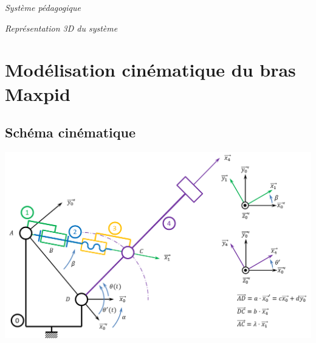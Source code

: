 \documentclass[10pt]{article}
\begin{document}

\begin{minipage}[b]{.3\linewidth}
\begin{center}

\textit{Système pédagogique}
\end{center}
\end{minipage} \hfill
\begin{minipage}[b]{.3\linewidth}
\begin{center}

\textit{Représentation 3D du système}
\end{center}
\end{minipage} \hfill
\begin{minipage}[b]{.3\linewidth}
\begin{center}

\end{center}
\end{minipage}



\setlength{\parskip}{0ex plus 0.2ex minus 0ex}
 \renewcommand{\contentsname}{}
 \renewcommand{\baselinestretch}{1}

\tableofcontents

 \renewcommand{\baselinestretch}{1.2}
\setlength{\parskip}{2ex plus 0.5ex minus 0.2ex}



\section{Modélisation cinématique du bras Maxpid}
\subsection{Schéma cinématique}


\begin{center}
 \includegraphics[width=.95\textwidth]{images/schema}
\end{center}
\end{document}
